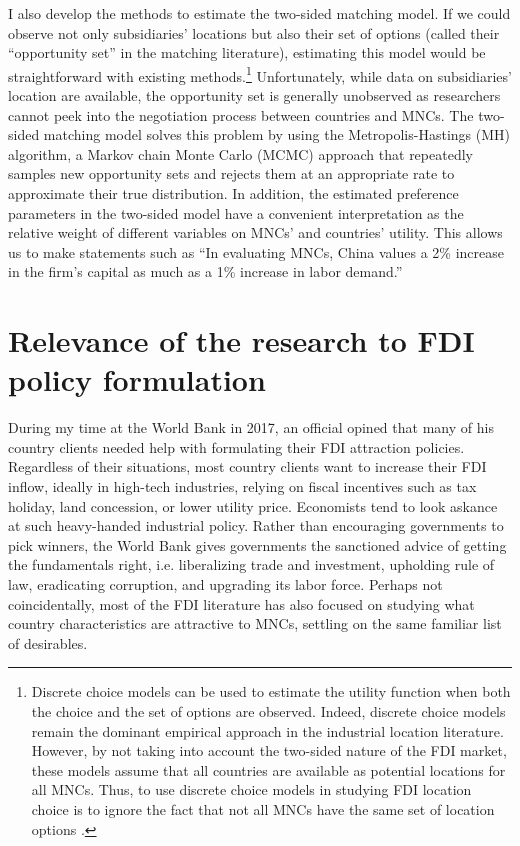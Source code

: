 I also develop the methods to estimate the two-sided matching model. If we could
observe not only subsidiaries' locations but also their set of options (called
their ``opportunity set'' in the matching literature), estimating this model
would be straightforward with existing methods.\footnote{Discrete choice models
  can be used to estimate the utility function when both the choice and the set
  of options are observed. Indeed, discrete choice models remain the dominant
  empirical approach in the industrial location literature. However, by not
  taking into account the two-sided nature of the FDI market, these models
  assume that all countries are available as potential locations for all MNCs.
  Thus, to use discrete choice models in studying FDI location choice is to
  ignore the fact that not all MNCs have the same set of location options
  \citep{Arauzo-Carod2010}.} Unfortunately, while data on subsidiaries' location
are available, the opportunity set is generally unobserved as researchers cannot
peek into the negotiation process between countries and MNCs. The two-sided
matching model solves this problem by using the Metropolis-Hastings (MH)
algorithm, a Markov chain Monte Carlo (MCMC) approach that repeatedly samples
new opportunity sets and rejects them at an appropriate rate to approximate
their true distribution. In addition, the estimated preference parameters in the
two-sided model have a convenient interpretation as the relative weight of
different variables on MNCs' and countries' utility. This allows us to make
statements such as ``In evaluating MNCs, China values a 2\% increase in the
firm's capital as much as a 1\% increase in labor demand.''

\section{Relevance of the research to FDI policy formulation}

During my time at the World Bank in 2017, an official opined that many of his
country clients needed help with formulating their FDI attraction policies.
Regardless of their situations, most country clients want to increase their FDI
inflow, ideally in high-tech industries, relying on fiscal incentives such as
tax holiday, land concession, or lower utility price. Economists tend to look
askance at such heavy-handed industrial policy. Rather than encouraging
governments to pick winners, the World Bank gives governments the sanctioned
advice of getting the fundamentals right, i.e. liberalizing trade and
investment, upholding rule of law, eradicating corruption, and upgrading its
labor force. Perhaps not coincidentally, most of the FDI literature has also
focused on studying what country characteristics are attractive to MNCs,
settling on the same familiar list of desirables.

